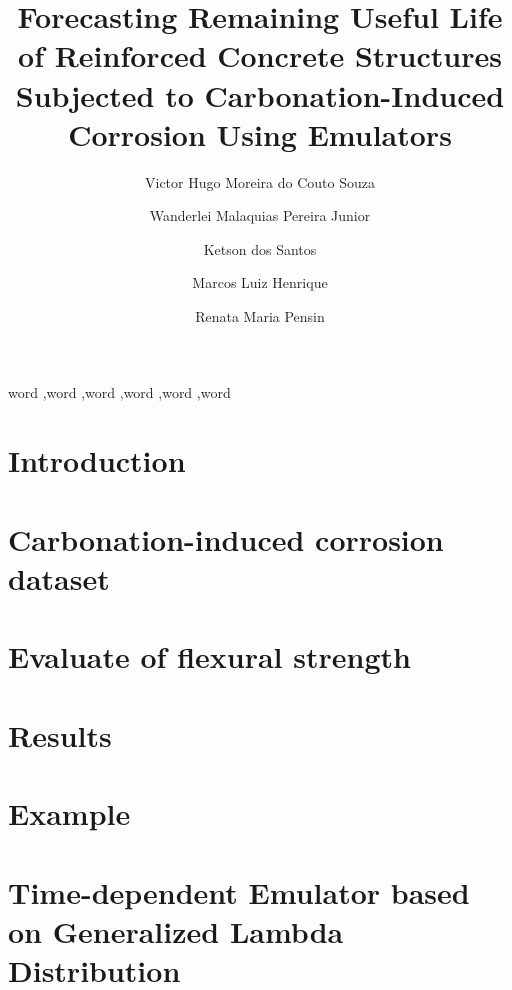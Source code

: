 \documentclass[preprint,11pt]{elsarticle}
\theoremstyle{plain}
\theoremstyle{definition}
\theoremstyle{remark}
\begin{document}
\begin{frontmatter}

\title{Forecasting Remaining Useful Life of Reinforced Concrete Structures Subjected to Carbonation-Induced Corrosion Using Emulators}

\author[label1]{Victor Hugo Moreira do Couto Souza}
\author[label1,label2]{Wanderlei Malaquias Pereira Junior}
\author[label2,label3]{Ketson dos Santos}
\author[label4]{Marcos Luiz Henrique}
\author[label1]{Renata Maria Pensin}

\address[label1]{Federal University of Catalão – UFCAT, Catalão, 75701-180, Goiás, Brazil}
\address[label2]{University of Minnesota, Minneapolis, MN 55455, United States}
\address[label3]{CEGE - UMN Department of Civil, Environmental, and Geo-Engineering, 790 Civil Engineering Bldg, 122, 500 Pillsbury Dr SE, Minneapolis, MN 55455, United States}
\address[label4]{NICEN - Interdisciplinary Center for Exact and Natural Sciences - CA, Caruaru, 55014-900, Pernambuco, Brazil}

\begin{abstract}
\lipsum[1]
\end{abstract}

\begin{keyword}
word \sep word \sep word \sep word \sep word \sep word

\end{keyword}

\end{frontmatter}

\linenumbers

\section{Introduction}\label{sec:intro}
\section{Carbonation-induced corrosion dataset}\label{sec:carb}
\section{Evaluate of flexural strength}\label{sec:concrete}
\section{Results}\label{sec:res}
\section{Example}\label{sec:exem}
%
\section{Time-dependent Emulator based on Generalized Lambda Distribution}


\end{document}
